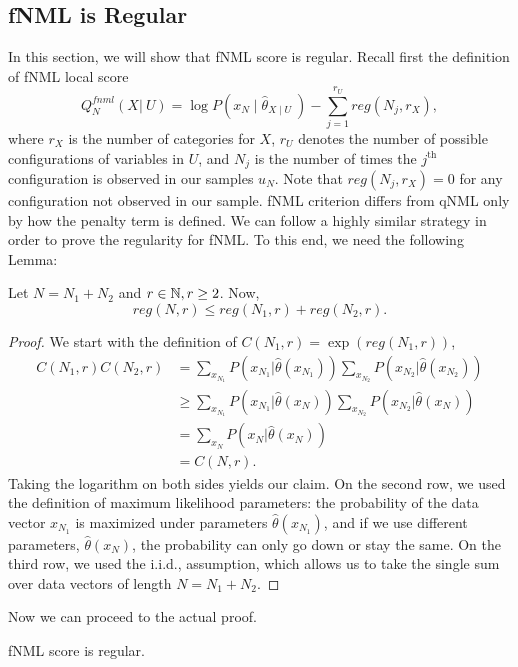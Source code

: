 \subsection{fNML is Regular}
In this section, we will show that fNML score is regular. Recall first the definition of fNML local score
\begin{equation}
Q^{fnml}_N(X  \vert \ U) = \log P(x_N \mid \hat{\theta}_{X\mid U} \ ) - \sum_{j = 1}^{r_U} reg(N_j,r_X),
\end{equation}where $r_X$ is the number of categories for $X$, $r_U$ denotes the number of possible configurations of variables in $U$, and $N_j$ is the number of times the $j^\text{th}$ configuration is observed in our samples $u_N$. Note that $reg(N_j,r_X) = 0$ for any configuration not observed in our sample. 
fNML criterion differs from qNML only by how the penalty term is defined. We can follow a highly similar strategy in order to prove the regularity for fNML. To this end, we need the following Lemma:
\begin{lemma}\label{regineq}
Let $N = N_1 + N_2$ and $r \in\mathbb{N}, r \geq 2$. Now,
$$
reg(N,r) \leq reg(N_1,r) + reg(N_2,r).
$$
\end{lemma}
\begin{proof}
We start with the definition of $C(N_1,r) = \exp(reg(N_1,r))$,
\begin{align*}
C(N_1,r)C(N_2,r) &= \sum_{x_{N_1}}P(x_{N_1} \vert \hat{\theta}(x_{N_1} ))\sum_{x_{N_2}}P(x_{N_2} \vert \hat{\theta}(x_{N_2} ))\\ & \geq
\sum_{x_{N_1}}P(x_{N_1} \vert \hat{\theta}(x_{N} ))\sum_{x_{N_2}}P(x_{N_2} \vert \hat{\theta}(x_{N} )) \\ &=
\sum_{x_{N}}P(x_{N} \vert \hat{\theta}(x_{N} )) \\ & = C(N,r).
\end{align*}Taking the logarithm on both sides yields our claim. On the second row, we used the definition of maximum likelihood parameters: the probability of the data vector $x_{N_1}$ is maximized under parameters $\hat{\theta}(x_{N_1})$, and if we use different parameters, $\hat{\theta}(x_{N})$, the probability can only go down or stay the same. On the third row, we used the i.i.d., assumption, which allows us to take the single sum over data vectors of length $N = N_1 + N_2$.
\end{proof}
Now we can proceed to the actual proof.
\begin{theorem}
fNML score is regular.
\end{theorem}
